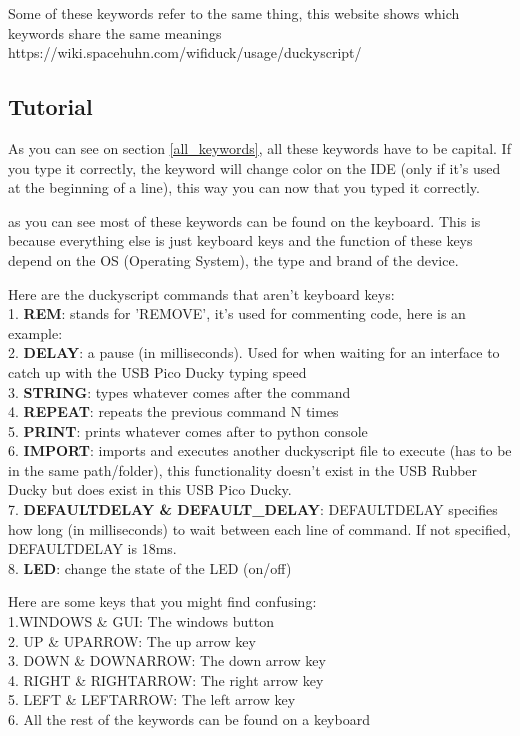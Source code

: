 \documentclass[a4paper,12pt]{article}
\begin{document}
Some of these keywords refer to the same thing, this website shows which keywords share the same meanings
https://wiki.spacehuhn.com/wifiduck/usage/duckyscript/

\subsection{Tutorial}

As you can see on section \ref{all_keywords}, all these keywords have to be capital. If you type it correctly, the keyword will change color on the IDE (only if it's used at the beginning of a line), this way you can now that you typed it correctly.

as you can see most of these keywords can be found on the keyboard. This is because everything else is just keyboard keys and the function of these keys depend on the OS (Operating System), the type and brand of the device. 

Here are the duckyscript commands that aren't keyboard keys:
\\1. \textbf{REM}: stands for 'REMOVE', it's used for commenting code, here is an example:
\\2. \textbf{DELAY}: a pause (in milliseconds). Used for when waiting for an interface to catch up with the USB Pico Ducky typing speed
\\3. \textbf{STRING}: types whatever comes after the command
\\4. \textbf{REPEAT}: repeats the previous command N times
\\5. \textbf{PRINT}: prints whatever comes after to python console
\\6. \textbf{IMPORT}: imports and executes another duckyscript file to execute (has to be in the same path/folder), this functionality doesn't exist in the USB Rubber Ducky but does exist in this USB Pico Ducky.
\\7. \textbf{DEFAULTDELAY \& DEFAULT\_DELAY}:  DEFAULTDELAY specifies how long (in milliseconds) to wait between each line of command. If not specified, DEFAULTDELAY is 18ms.
\\8. \textbf{LED}: change the state of the LED (on/off)

Here are some keys that you might find confusing:
\\1.WINDOWS \& GUI: The windows button
\\2. UP \& UPARROW: The up arrow key
\\3. DOWN \& DOWNARROW: The down arrow key
\\4. RIGHT \& RIGHTARROW: The right arrow key
\\5. LEFT \& LEFTARROW: The left arrow key
\\6. All the rest of the keywords can be found on a keyboard
\end{document}
